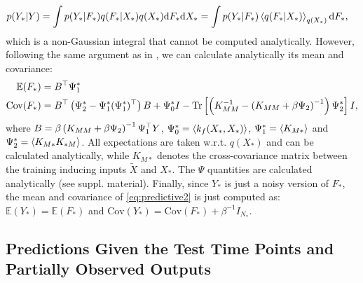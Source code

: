 \documentclass{article} %
\begin{document}
\begin{align} 
p(Y_*| Y) {}& =  \int p(Y_*| F_*)  q(F_*|X_*) q(X_*) \text{d} F_* \text{d} X_* = \int p(Y_* | F_*) \left\langle q(F_* | X_*) \right\rangle_{q(X_*)} \text{d} F_* , \label{eq:predictive2}
\end{align}
%
which is a non-Gaussian integral that cannot be computed analytically. However, following the same argument as in \cite{rasmussen-williams, Girard03gaussianprocess}, we can
calculate analytically its mean and covariance:
%
\begin{align}
 \mathbb{E}(F_*) ={}&  B^{\top} \Psi_1^* \label{meanFstar} \\
 \text{Cov}(F_*) ={}& B^{\top} \left( \Psi_2^* - \Psi_1^* (\Psi_1^*)^{\top} \right) B + \Psi_0^* I - \text{Tr} \left[ \left( K_{MM}^{-1} - \left( K_{MM} + \beta \Psi_2 \right)^{-1} \right) \Psi_2^* \right] I,
\end{align}
%
where $B = \beta \left( K_{MM} + \beta \Psi_2 \right)^{-1} \Psi_1^{\top}
Y$, $\Psi_0^* = \left\langle k_f(X_*, X_*) \right\rangle$, $\Psi_1^* = \left\langle K_{M*} \right\rangle$
and $\Psi_2^* = \left\langle K_{M*} K_{*M} \right\rangle$. All expectations are taken
w.r.t. $q(X_*)$ and can be calculated analytically, while $K_{M*}$
denotes the cross-covariance matrix between the training inducing
inputs $\tilde{X}$ and $X_*$. The $\Psi$ quantities are calculated analytically (see suppl. material). Finally, since $Y_*$ is just a noisy version of
$F_*$, the mean and covariance of \eqref{eq:predictive2} is just
computed as: $\mathbb{E}(Y_*) = \mathbb{E}(F_*)$ and $\text{Cov}(Y_*)
= \text{Cov}(F_*) + \beta^{-1} I_{N_*}$.
%


\subsection{Predictions Given the Test Time Points and Partially Observed Outputs}
\end{document}
